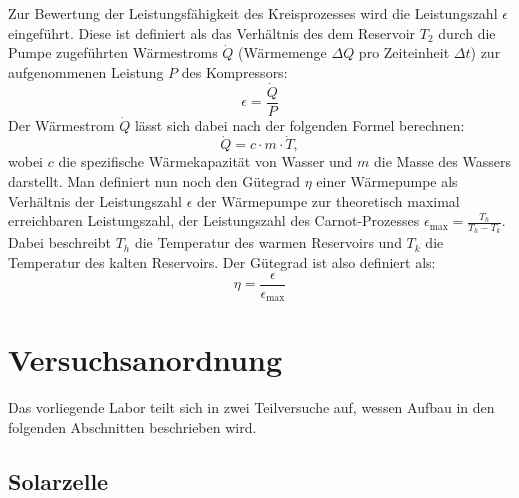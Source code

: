 \documentclass[english, ngerman]{scrartcl}
\begin{document}
Zur Bewertung der Leistungsfähigkeit des Kreisprozesses wird die Leistungszahl $\epsilon$ eingeführt. Diese ist definiert als das Verhältnis des dem Reservoir $T_2$ durch die Pumpe zugeführten Wärmestroms $\dot{Q}$ (Wärmemenge $\Delta Q$ pro Zeiteinheit $\Delta t$) zur aufgenommenen Leistung $P$ des Kompressors:
%
\begin{equation}
    \label{eq:leistungszahl}
    \epsilon = \frac{\dot{Q}}{P}
\end{equation}
%
Der Wärmestrom $\dot{Q}$ lässt sich dabei nach der folgenden Formel berechnen:
%
\begin{equation}
    \label{eq:waermestrom}
    \dot{Q} = c \cdot m \cdot \dot{T},
\end{equation}
%
wobei $c$ die spezifische Wärmekapazität von Wasser und $m$ die Masse des Wassers darstellt. Man definiert nun noch den Gütegrad $\eta$ einer Wärmepumpe als Verhältnis der Leistungszahl $\epsilon$ der Wärmepumpe zur theoretisch maximal erreichbaren Leistungszahl, der Leistungszahl des Carnot-Prozesses $\epsilon_{\text{max}} = \frac{T_h}{T_h-T_k}$. Dabei beschreibt $T_h$ die Temperatur des warmen Reservoirs und $T_k$ die Temperatur des kalten Reservoirs. Der Gütegrad ist also definiert als:
%
\begin{equation}
    \label{eq:guetegrad}
    \eta = \frac{\epsilon}{\epsilon_{\text{max}}}
\end{equation}



\section{Versuchsanordnung}
\label{sec:versuchsanordnung}

Das vorliegende Labor teilt sich in zwei Teilversuche auf, wessen Aufbau in den folgenden Abschnitten beschrieben wird.

\subsection{Solarzelle}
\label{subsec:anordnung_solarzelle}
\end{document}
